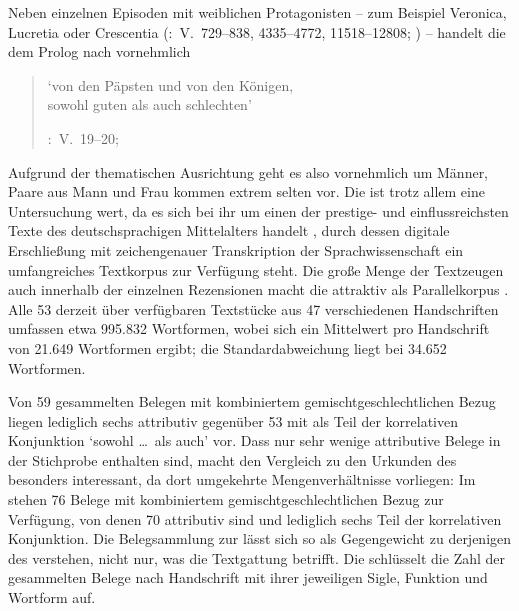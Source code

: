 Neben einzelnen Episoden mit weiblichen Protagonisten -- zum Beispiel Veronica,
Lucretia oder Crescentia (\KC:~V.~729--838, 4335--4772, 11518--12808;
\cite[vgl.][94--96, 161--169, 292--314]{schroeder1895}) -- handelt die \KC{} dem
Prolog nach vornehmlich

\blockquote[{\KC:~V.~19--20; \cite[79]{schroeder1895}}]{

	`von den Päpsten und von den Königen,\\
	sowohl guten als auch schlechten'
}

Aufgrund der thematischen Ausrichtung geht es also vornehmlich um Männer, Paare
aus Mann und Frau kommen extrem selten vor. Die \KC{} ist trotz allem eine
Untersuchung wert, da es sich bei ihr um einen der prestige- und
einflussreichsten Texte des deutschsprachigen Mittelalters handelt
\autocite[93]{wolf2008}, durch dessen digitale Erschließung mit zeichengenauer
Transkription \autocite{kcdigital} der Sprachwissenschaft ein umfangreiches
Textkorpus zur Verfügung steht. Die große Menge der Textzeugen auch innerhalb
der einzelnen Rezensionen macht die \KC{} attraktiv als Parallelkorpus
\autocite{cysouwwaelchli2007}. Alle 53 derzeit über 
verfügbaren Textstücke aus 47 verschiedenen Handschriften umfassen etwa 995.832
Wortformen, wobei sich ein Mittelwert pro Handschrift von 21.649 Wortformen
ergibt; die Standardabweichung liegt bei 34.652 Wortformen.

Von 59 gesammelten Belegen mit kombiniertem gemischtgeschlechtlichen Bezug
liegen lediglich sechs attributiv gegenüber 53 mit  als Teil der
korrelativen Konjunktion  `sowohl \dots\ als auch' vor.
Dass nur sehr wenige attributive Belege in der Stichprobe enthalten sind, macht
den Vergleich zu den Urkunden des \CAO{} besonders interessant, da dort
umgekehrte Mengenverhältnisse vorliegen: Im \CAO{} stehen 76 Belege mit
kombiniertem gemischtgeschlechtlichen Bezug zur Verfügung, von denen 70
attributiv sind und lediglich sechs Teil der korrelativen Konjunktion. Die
Belegsammlung zur \KC{} lässt sich so als Gegengewicht zu derjenigen des \CAO{}
verstehen, nicht nur, was die Textgattung betrifft. Die 
schlüsselt die Zahl der gesammelten Belege nach Handschrift mit ihrer
jeweiligen Sigle, Funktion und Wortform auf.

